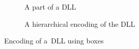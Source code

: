 \begin{figure}[t]
\begin{center}
  \begin{subfigure}[b]{0.6\linewidth}
  \begin{center}
    
  \end{center}
  \caption{A part of a DLL}
  \label{fig:decomp_c}
  \end{subfigure}

  \noindent
  \begin{subfigure}[b]{0.6\linewidth}
  \begin{center}
    
  \end{center}
  \caption{A hierarchical encoding of the DLL}
  \label{fig:decomp_d}
  \end{subfigure}


  \caption{Encoding of a~DLL using boxes}

  \label{figDecomposition2}

\end{center}
\end{figure}


